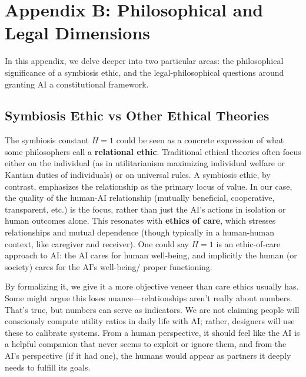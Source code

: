 \documentclass[12pt]{article}
\begin{document}

\newpage

\section{Appendix B: Philosophical and Legal Dimensions}
In this appendix, we delve deeper into two particular areas: the philosophical significance of a symbiosis ethic, and the legal-philosophical questions around granting AI a constitutional framework.

\subsection{Symbiosis Ethic vs Other Ethical Theories}
The symbiosis constant $H=1$ could be seen as a concrete expression of what some philosophers call a \textbf{relational ethic}. Traditional ethical theories often focus either on the individual (as in utilitarianism maximizing individual welfare or Kantian duties of individuals) or on universal rules. A symbiosis ethic, by contrast, emphasizes the relationship as the primary locus of value. In our case, the quality of the human-AI relationship (mutually beneficial, cooperative, transparent, etc.) is the focus, rather than just the AI’s actions in isolation or human outcomes alone. This resonates with \textbf{ethics of care}, which stresses relationships and mutual dependence (though typically in a human-human context, like caregiver and receiver). One could say $H=1$ is an ethic-of-care approach to AI: the AI cares for human well-being, and implicitly the human (or society) cares for the AI’s well-being/ proper functioning.

By formalizing it, we give it a more objective veneer than care ethics usually has. Some might argue this loses nuance—relationships aren’t really about numbers. That’s true, but numbers can serve as indicators. We are not claiming people will consciously compute utility ratios in daily life with AI; rather, designers will use these to calibrate systems. From a human perspective, it should feel like the AI is a helpful companion that never seems to exploit or ignore them, and from the AI’s perspective (if it had one), the humans would appear as partners it deeply needs to fulfill its goals.
\end{document}
